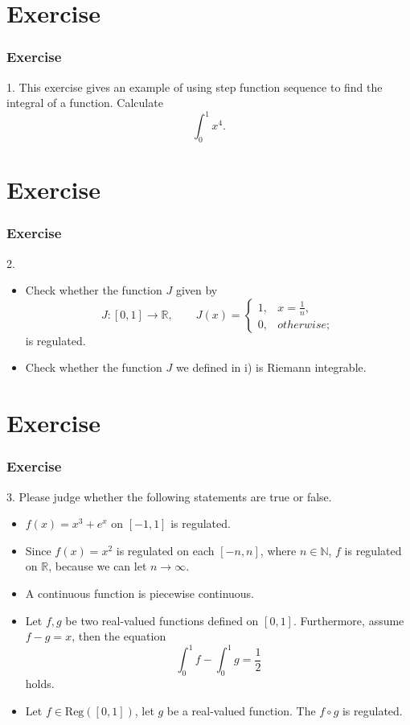 \documentclass[12pt, t]{beamer}
\begin{document}
\section{Exercise}
\begin{frame}
    \frametitle{Exercise}
    1. This exercise gives an example of using step function sequence to find the integral of a function. Calculate
    \begin{equation*}
        \int_0^1x^4.
    \end{equation*}
\end{frame}

\section{Exercise}
\begin{frame}
    \frametitle{Exercise}
    2.
    \begin{itemize}
        \item Check whether the function $J$ given by
              \begin{equation*}
                  J:[0,1]\rightarrow\mathbb{R}, \qquad J(x)=
                  \begin{cases}
                      1, & x=\frac{1}{n}, \\
                      0, & otherwise;
                  \end{cases}
              \end{equation*}
              is regulated.\\
              \vspace{1em}
        \item Check whether the function $J$ we defined in i) is Riemann integrable.
    \end{itemize}
\end{frame}

\section{Exercise}
\begin{frame}
    \frametitle{Exercise}
    3. Please judge whether the following statements are true or false.
    \begin{itemize}
        \item $f(x)=x^3+e^x$ on $[-1,1]$ is regulated.
        \item Since $f(x)=x^2$ is regulated on each $[-n,n]$, where $n\in\mathbb{N}$, $f$ is regulated on $\mathbb{R}$, because we can let $n\rightarrow\infty$.
        \item A continuous function is piecewise continuous.
        \item Let $f,g$ be two real-valued functions defined on $[0,1]$. Furthermore, assume $f-g=x$, then the equation \begin{equation*}
                  \int_0^1f-\int_0^1g=\frac{1}{2}
              \end{equation*} holds.
        \item Let $f\in\text{Reg}([0,1])$, let $g$ be a real-valued function. The $f\circ g$ is regulated.
    \end{itemize}
\end{frame}
\end{document}
